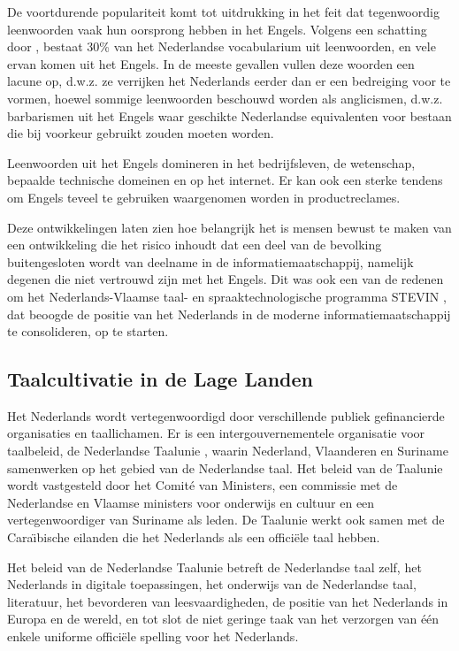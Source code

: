 \documentclass[]{../../metanetpaper}
\begin{document}
\begin{multicols}{2}
    De voortdurende populariteit komt tot uitdrukking in het feit dat tegenwoordig leenwoorden vaak hun oorsprong hebben in het Engels. Volgens een schatting door \cite{VanderSijs:2005}, bestaat 30\% van het Nederlandse vocabularium uit leenwoorden, en vele ervan komen uit het Engels. In de meeste gevallen vullen deze woorden een lacune op, d.w.z. ze verrijken het Nederlands eerder dan er een bedreiging voor te vormen, hoewel sommige leenwoorden beschouwd worden als anglicismen, d.w.z. barbarismen uit het Engels waar geschikte Nederlandse equivalenten voor bestaan die bij voorkeur gebruikt zouden moeten worden.

    Leenwoorden uit het Engels domineren in het bedrijfsleven, de wetenschap, bepaalde technische domeinen en op het internet. Er kan ook een sterke tendens om Engels teveel te gebruiken waargenomen worden in productreclames.

    Deze ontwikkelingen laten zien hoe belangrijk het is mensen bewust te maken van een ontwikkeling die het risico inhoudt dat een deel van de bevolking buitengesloten wordt van deelname in de informatiemaatschappij, namelijk degenen die niet vertrouwd zijn met het Engels. Dit was ook een van de redenen om het Nederlands-Vlaamse taal- en spraaktechnologische programma STEVIN \cite{STEVIN}, dat beoogde de positie van het Nederlands in de moderne informatiemaatschappij te consolideren, op te starten.

\subsection{Taalcultivatie in de Lage Landen}

   Het Nederlands wordt vertegenwoordigd door verschillende publiek gefinancierde organisaties en taallichamen. Er is een intergouvernementele organisatie voor taalbeleid, de Nederlandse Taalunie \cite{NTU}, waarin Nederland, Vlaanderen en Suriname samenwerken op het gebied van de Nederlandse taal. Het beleid van de Taalunie wordt vastgesteld door het Comit{\'e} van Ministers, een commissie met de Nederlandse en Vlaamse ministers voor onderwijs en cultuur en een vertegenwoordiger van Suriname als leden. De Taalunie werkt ook samen met de Cara{\"\i}bische eilanden die het Nederlands als een offici{\"e}le taal hebben.

   Het beleid van de Nederlandse Taalunie betreft de Nederlandse taal zelf, het Nederlands in digitale toepassingen, het onderwijs van de Nederlandse taal, literatuur, het bevorderen van leesvaardigheden, de positie van het Nederlands in Europa en de wereld, en tot slot de niet geringe taak van het verzorgen van {\'e}{\'e}n enkele uniforme offici{\"e}le spelling voor het Nederlands.


\end{multicols}
\end{document}
